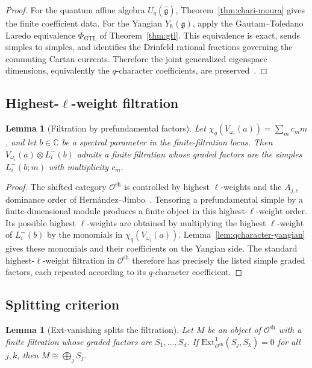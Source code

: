 \documentclass[11pt,reqno]{amsart}
\newtheorem{lemma}[theorem]{Lemma}
\theoremstyle{definition}
\theoremstyle{remark}
\newcommand{\cO}{\mathcal{O}}
\newcommand{\fg}{\mathfrak{g}}
\newcommand{\Ext}{\mathrm{Ext}}
\newcommand{\Yh}{Y_\hbar(\fg)}
\newcommand{\Uq}{U_q(\hat{\fg})}
\numberwithin{equation}{section}
\begin{document}
\begin{proof}
For the quantum affine algebra $\Uq$, Theorem~\ref{thm:chari-moura}
gives the finite coefficient data. For the Yangian $\Yh$, apply
the Gautam--Toledano Laredo equivalence
$\Phi_{\mathrm{GTL}}$ of Theorem~\ref{thm:gtl}. This equivalence
is exact, sends simples to simples, and identifies the Drinfeld
rational fractions governing the commuting Cartan currents.
Therefore the joint generalized eigenspace dimensions, equivalently
the $q$-character coefficients, are preserved~\cite{GTL17}.
\end{proof}

\subsection{Highest-$\ell$-weight filtration}

\begin{lemma}[Filtration by prefundamental factors]
\label{lem:prefundamental-filtration}
Let $\chi_q(V_{\omega_i}(a))=\sum_m c_m m$, and let
$b \in \mathbb{C}$ be a spectral parameter in the finite-filtration
locus. Then
$V_{\omega_i}(a)\otimes L^-_i(b)$ admits a finite filtration whose
graded factors are the simples
$L^-_i(b;m)$ with multiplicity $c_m$.
\end{lemma}

\begin{proof}
The shifted category $\cO^{\mathrm{sh}}$ is controlled by
highest $\ell$-weights and the $A_{j,c}$ dominance order of
Hern\'andez--Jimbo~\cite{HernandezJimbo12}. Tensoring a
prefundamental simple by a finite-dimensional module produces a
finite object in this highest-$\ell$-weight order. Its possible
highest $\ell$-weights are obtained by multiplying the highest
$\ell$-weight of $L^-_i(b)$ by the monomials in
$\chi_q(V_{\omega_i}(a))$. Lemma~\ref{lem:qcharacter-yangian}
gives these monomials and their coefficients on the Yangian side.
The standard highest-$\ell$-weight filtration in
$\cO^{\mathrm{sh}}$ therefore has precisely the listed simple
graded factors, each repeated according to its $q$-character
coefficient.
\end{proof}

\subsection{Splitting criterion}

\begin{lemma}[Ext-vanishing splits the filtration]
\label{lem:ext-splitting}
Let $M$ be an object of $\cO^{\mathrm{sh}}$ with a finite
filtration whose graded factors are $S_1,\ldots,S_d$. If
$\Ext^1_{\cO^{\mathrm{sh}}}(S_j,S_k)=0$ for all $j,k$, then
$M\cong\bigoplus_j S_j$.
\end{lemma}
\end{document}
